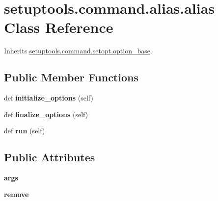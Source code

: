 \hypertarget{classsetuptools_1_1command_1_1alias_1_1alias}{}\section{setuptools.\+command.\+alias.\+alias Class Reference}
\label{classsetuptools_1_1command_1_1alias_1_1alias}


Inherits \hyperlink{classsetuptools_1_1command_1_1setopt_1_1option__base}{setuptools.\+command.\+setopt.\+option\+\_\+base}.

\subsection*{Public Member Functions}
\begin{DoxyCompactItemize}
\item 
\mbox{\label{classsetuptools_1_1command_1_1alias_1_1alias_a0aeb707cb88f10ec59c302f165d1cfd0}} 
def {\bfseries initialize\+\_\+options} (self)
\item 
\mbox{\label{classsetuptools_1_1command_1_1alias_1_1alias_a790538ebcd744e88e5a2f806f1d11f93}} 
def {\bfseries finalize\+\_\+options} (self)
\item 
\mbox{\label{classsetuptools_1_1command_1_1alias_1_1alias_a18403f966465c1665f92e08ec188aa2a}} 
def {\bfseries run} (self)
\end{DoxyCompactItemize}
\subsection*{Public Attributes}
\begin{DoxyCompactItemize}
\item 
\mbox{\label{classsetuptools_1_1command_1_1alias_1_1alias_a4351af0dab2928c3e5811425cd26ff45}} 
{\bfseries args}
\item 
\mbox{\label{classsetuptools_1_1command_1_1alias_1_1alias_a3de85705b6935c662ccecee8cc2b59d9}} 
{\bfseries remove}
\end{DoxyCompactItemize}
